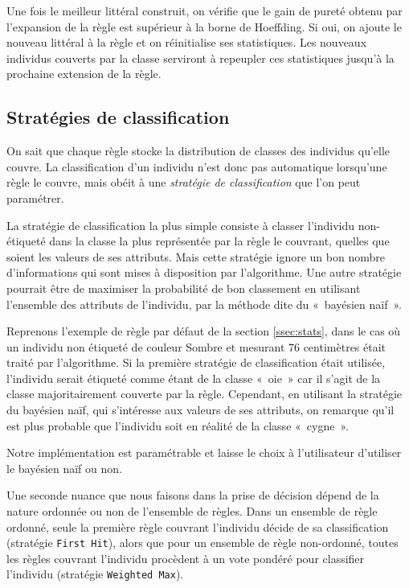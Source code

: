             Une fois le meilleur littéral construit, on vérifie que le gain de pureté obtenu par l'expansion de la règle est supérieur à la borne de Hoeffding. Si oui, on ajoute le nouveau littéral à la règle et on réinitialise ses statistiques. Les nouveaux individus couverts par la classe serviront à repeupler ces statistiques jusqu'à la prochaine extension de la règle.

        
        \subsection{Stratégies de classification}\label{ssec:nondecisional}
        
            On sait que chaque règle stocke la distribution de classes des individus qu'elle couvre. La classification d'un individu n'est donc pas automatique lorsqu'une règle le couvre, mais obéit à une \emph{stratégie de classification} que l'on peut paramétrer.

            La stratégie de classification la plus simple consiste à classer l’individu non-étiqueté dans la classe la plus représentée par la règle le couvrant, quelles que soient les valeurs de ses attributs. Mais cette stratégie ignore un bon nombre d’informations qui sont mises à disposition par l’algorithme. Une autre stratégie pourrait être de maximiser la probabilité de bon classement en utilisant l’ensemble des attributs de l’individu, par la méthode dite du «~bayésien naïf~».\cite{Gama-VFDR}
            
            Reprenons l’exemple de règle par défaut de la section \ref{ssec:stats}, dans le cas où un individu non étiqueté de couleur Sombre et mesurant 76 centimètres était traité par l’algorithme. Si la première stratégie de classification était utilisée, l’individu serait étiqueté comme étant de la classe «~oie~» car il s'agit de la classe majoritairement couverte par la règle. Cependant, en utilisant la stratégie du bayésien naïf, qui s'intéresse aux valeurs de ses attributs, on remarque qu’il est plus probable que l’individu soit en réalité de la classe «~cygne~». 

            Notre implémentation est paramétrable et laisse le choix à l'utilisateur d'utiliser le bayésien naïf ou non.

            Une seconde nuance que nous faisons dans la prise de décision dépend de la nature ordonnée ou non de l'ensemble de règles. Dans un ensemble de règle ordonné, seule la première règle couvrant l’individu décide de sa classification (stratégie \texttt{First Hit}), alors que pour un ensemble de règle non-ordonné, toutes les règles couvrant l’individu procèdent à un vote pondéré pour classifier l’individu (stratégie \texttt{Weighted Max}).





